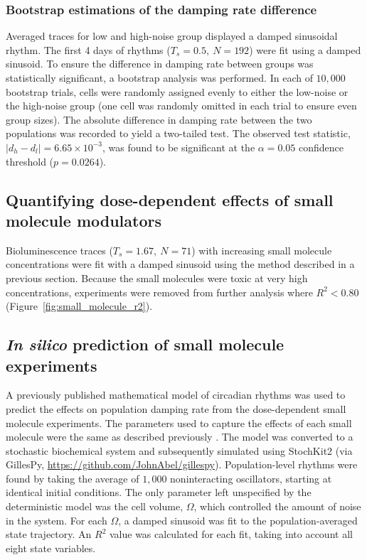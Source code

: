 \documentclass[11pt, letterpaper]{article}
\begin{document}
\subsubsection*{Bootstrap estimations of the damping rate difference}
Averaged traces for low and high-noise group displayed a damped sinusoidal rhythm.
The first 4 days of rhythms ($T_s = 0.5,\ N = 192$) were fit using a damped sinusoid.
To ensure the difference in damping rate between groups was statistically significant, a bootstrap analysis was performed.
In each of $10,000$ bootstrap trials, cells were randomly assigned evenly to either the low-noise or the high-noise group (one cell was randomly omitted in each trial to ensure even group sizes).
The absolute difference in damping rate between the two populations was recorded to yield a two-tailed test.
The observed test statistic, $|d_h - d_l| = 6.65\times10^{-3}$, was found to be significant at the $\alpha = 0.05$ confidence threshold ($p = 0.0264$).

\subsection*{Quantifying dose-dependent effects of small molecule modulators}
Bioluminescence traces ($T_s = 1.67,\ N=71$) with increasing small molecule concentrations were fit with a damped sinusoid using the method described in a previous section.
Because the small molecules were toxic at very high concentrations, experiments were removed from further analysis where $R^2 < 0.80$ (Figure~\ref{fig:small_molecule_r2}).

\subsection*{{\itshape In silico} prediction of small molecule experiments}
A previously published mathematical model of circadian rhythms \cite{Hirota2012} was used to predict the effects on population damping rate from the dose-dependent small molecule experiments.
The parameters used to capture the effects of each small molecule were the same as described previously \cite{St.John2014}.
The model was converted to a stochastic biochemical system and subsequently simulated using StochKit2 \cite{Sanft2011a} (via GillesPy, \url{https://github.com/JohnAbel/gillespy}).
Population-level rhythms were found by taking the average of $1,000$ noninteracting oscillators, starting at identical initial conditions.
The only parameter left unspecified by the deterministic model was the cell volume, $\Omega$, which controlled the amount of noise in the system.
For each $\Omega$, a damped sinusoid was fit to the population-averaged state trajectory. 
An $R^2$ value was calculated for each fit, taking into account all eight state variables.
\end{document}
